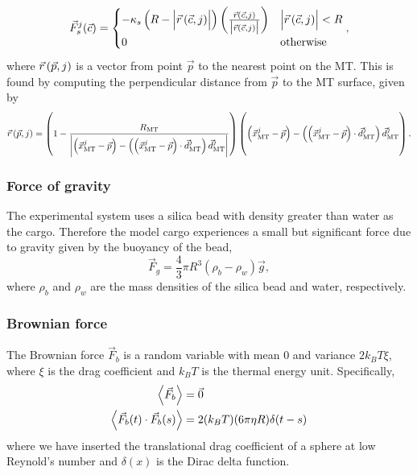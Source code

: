 \begin{equation} \label{eq:steric_force}
\vec{F}_s^j(\vec{c})= 
\begin{cases}

	- \kappa_s \left(R - \vqty\Big{ \rvec{\vec{c}} } \right) \left( \frac{\rvec{\vec{c}}}{\vqty\big{ \rvec{\vec{c}} }} \right) & \vqty\Big{ \rvec{\vec{c}} } <  R\\
	
	0 & \text{otherwise}
	
\end{cases},
\end{equation}
where $\vec{r} \left(\vec{p} , j \right)$ is a vector from point $\vec{p}$ to the nearest point on the MT. This is found by computing the perpendicular distance from $\vec{p}$ to the MT surface, given by
\def\ceq{\left( \xmt^j-\vec{p} \right) - \left( \left( \xmt^j - \vec{p} \right) \cdot \dmt^j \right) \dmt^j}
\def\rbyceq{\frac{R_\text{MT}}{\vqty\bigg{\ceq}}}
%
\begin{equation} \label{eq:r_vec}
\rvec{\vec{p}} = 
\left( 1- \rbyceq \right)  
\left( \ceq \vphantom{\rbyceq} \right).
\end{equation}

\subsubsection*{Force of gravity}

The experimental system uses a silica bead with density greater than water as the cargo. Therefore the model cargo experiences a small but significant force due to gravity given by the buoyancy of the bead,
\begin{equation} \label{eq:F_g}
\vec{F}_g= \frac{4}{3} \pi R^3 (\rho_b - \rho_w) \vec{g},
\end{equation}
where $\rho_b$ and $\rho_w$ are the mass densities of the silica bead and water, respectively.

\subsubsection*{Brownian force}

The Brownian force $\vec{F}_b$ is a random variable with mean 0 and variance $2 k_B T \xi$, where $\xi$ is the drag coefficient and $k_B T$ is the thermal energy unit. Specifically,
\begin{align} \label{eq:Brownian_force}
\ev{\vec{F}_b} &= \vec{0} \\
\ev{\vec{F}_b(t) \cdot \vec{F}_b(s)} &= 2 (k_B T) (6 \pi \eta R) \delta(t-s)
\end{align}
where we have inserted the translational drag coefficient of a sphere at low Reynold's number and $\delta(x)$ is the Dirac delta function.

